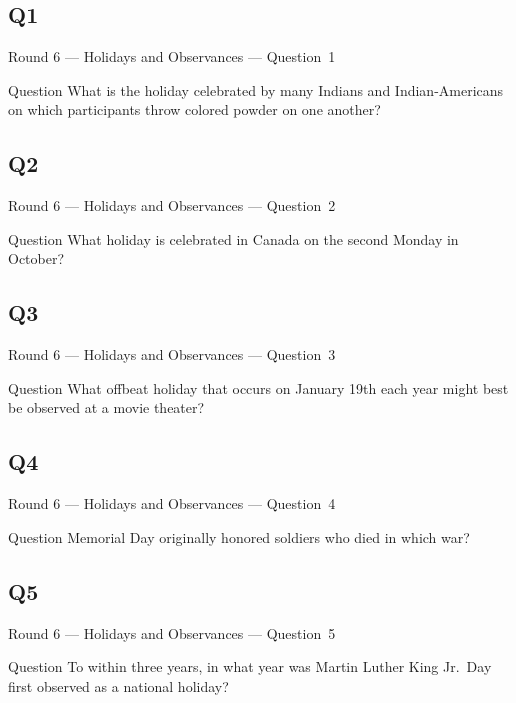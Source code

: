 \documentclass[11pt]{beamer}
\begin{document}
\subsection*{Q1}
\begin{frame}[t]{Round 6 --- Holidays and Observances --- \mbox{Question 1}}
\begin{block}{Question}
What is the holiday celebrated by many  Indians and Indian-Americans on which participants throw colored powder on one another?
\end{block}
\end{frame}
\subsection*{Q2}
\begin{frame}[t]{Round 6 --- Holidays and Observances --- \mbox{Question 2}}
\begin{block}{Question}
What holiday is celebrated in Canada on the second Monday in October?
\end{block}
\end{frame}
\subsection*{Q3}
\begin{frame}[t]{Round 6 --- Holidays and Observances --- \mbox{Question 3}}
\begin{block}{Question}
What offbeat holiday that occurs on January 19th each year might best be observed at a movie theater?
\end{block}
\end{frame}
\subsection*{Q4}
\begin{frame}[t]{Round 6 --- Holidays and Observances --- \mbox{Question 4}}
\begin{block}{Question}
Memorial Day originally honored soldiers who died in which war?
\end{block}
\end{frame}
\subsection*{Q5}
\begin{frame}[t]{Round 6 --- Holidays and Observances --- \mbox{Question 5}}
\begin{block}{Question}
To within three years, in what year was Martin Luther King Jr.\ Day first observed as a national holiday?
\end{block}
\end{frame}
\end{document}
